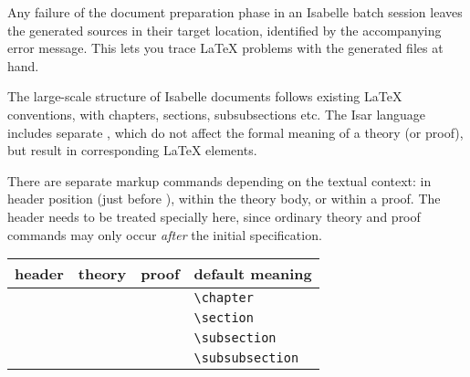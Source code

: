\begin{isabellebody}
\begin{isamarkuptext}
  \medskip Any failure of the document preparation phase in an
  Isabelle batch session leaves the generated sources in their target
  location, identified by the accompanying error message.  This lets
  you trace {\LaTeX} problems with the generated files at hand.%
\end{isamarkuptext}%
\isamarkuptrue%
%
\isamarkuptrue%
%
\begin{isamarkuptext}%
The large-scale structure of Isabelle documents follows existing
  {\LaTeX} conventions, with chapters, sections, subsubsections etc.
  The Isar language includes separate , which
  do not affect the formal meaning of a theory (or proof), but result
  in corresponding {\LaTeX} elements.

  There are separate markup commands depending on the textual context:
  in header position (just before ), within the
  theory body, or within a proof.  The header needs to be treated
  specially here, since ordinary theory and proof commands may only
  occur \emph{after} the initial  specification.

  \medskip

  \begin{tabular}{llll}
  header & theory & proof & default meaning \\\hline
    & \commdx{chapter} & & \verb,\chapter, \\
  \commdx{header} & \commdx{section} & \commdx{sect} & \verb,\section, \\
    & \commdx{subsection} & \commdx{subsect} & \verb,\subsection, \\
    & \commdx{subsubsection} & \commdx{subsubsect} & \verb,\subsubsection, \\
  \end{tabular}

  \medskip


\end{isamarkuptext}
\end{isabellebody}
